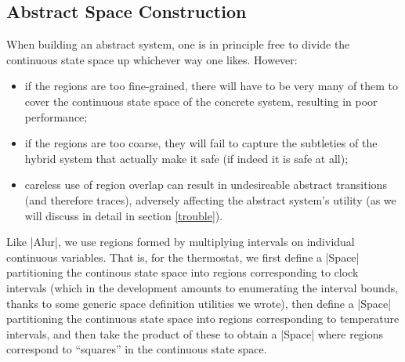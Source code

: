 \documentclass[runningheads]{llncs}
\begin{document}



\subsection{Abstract Space Construction}
\label{abs.space.constr}

When building an abstract system, one is in principle free to divide the continuous state space up whichever way one likes. However:
\begin{itemize}
\item if the regions are too fine-grained, there will have to be very many of them to cover the continuous state space of the concrete system, resulting in poor performance;
\item if the regions are too coarse, they will fail to capture the subtleties of the hybrid system that actually make it safe (if indeed it is safe at all);
\item careless use of region overlap can result in undesireable abstract transitions (and therefore traces), adversely affecting the abstract system's utility (as we will discuss in detail in section \ref{trouble}).
\end{itemize}

Like |Alur|, we use regions formed by multiplying intervals on individual continuous variables. That is, for the thermostat, we first define a |Space| partitioning the continous state space into regions corresponding to clock intervals (which in the development amounts to enumerating the interval bounds, thanks to some generic space definition utilities we wrote), then define a |Space| partitioning the continuous state space into regions corresponding to temperature intervals, and then take the product of these to obtain a |Space| where regions correspond to ``squares'' in the continuous state space.
\end{document}
